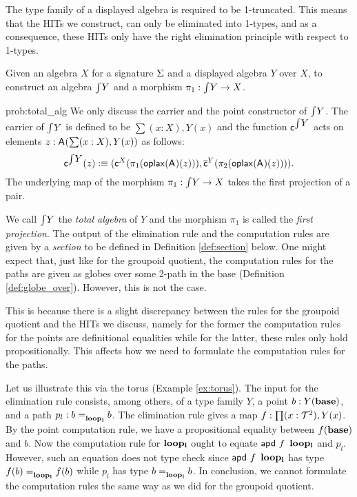 \begin{remark}
The type family of a displayed algebra is required to be 1-truncated.
This means that the HITs we construct, can only be eliminated into
1-types, and as a consequence, these HITs only have the right
elimination principle with respect to 1-types.
\end{remark}

\begin{problem}
\label{prob:total_alg}
Given an algebra $X$ for a signature $\Sigma$ and a displayed algebra $Y$ over $X$,
to construct an algebra $\textstyle \int_{}{Y}$ and a morphism $\pi_1 : \textstyle \int_{}{Y} \rightarrow X$.
\end{problem}

\begin{construction}{prob:total_alg}
We only discuss the carrier and the point constructor of $\textstyle \int_{}{Y}$.
The carrier of $\textstyle \int_{}{Y}$ is defined to be $\sum (x : X), Y(x)$
and the function $\mathsf{c}^{\textstyle \int_{}{Y}}$ acts on elements $z : \mathsf{A}^{}(\sum (x : X), Y(x))$ as follows:
\[
\mathsf{c}^{\textstyle \int_{}{Y}}(z) :\equiv
(\mathsf{c}^{X}(\pi_1(\mathsf{oplax}(\mathsf{A}^{})(z)))
,
\overline{\mathsf{c}}^{Y}(\pi_2(\mathsf{oplax}(\mathsf{A}^{})(z)))).
\]
The underlying map of the morphism $\pi_1 : \textstyle \int_{}{Y} \rightarrow X$ takes the first projection of a pair.
\end{construction}

We call $\textstyle \int_{}{Y}$ the \emph{total algebra} of $Y$ and the morphism $\pi_1$ is called the \emph{first projection}.
The output of the elimination rule and the computation rules are given by a \emph{section} to be defined in Definition \ref{def:section} below.
One might expect that, just like for the groupoid quotient, the computation rules for the paths
are given as globes over some 2-path in the base (Definition \ref{def:globe_over}).
However, this is not the case.

This is because there is a slight discrepancy between the rules for the groupoid quotient and the HITs we discuss,
namely for the former the computation rules for the points are definitional equalities
while for the latter, these rules only hold propositionally.
This affects how we need to formulate the computation rules for the paths.

Let us illustrate this via the torus (Example \ref{ex:torus}).
The input for the elimination rule consists, among others, of a type family $Y$, a point $b : Y(\operatorname{\mathbf{base}})$,
and a path $p_l : b =_{\operatorname{\mathbf{loop_l}}}^{} b$.
The elimination rule gives a map $f : \prod (x : \mathcal{T}^2) , Y(x)$.
By the point computation rule, we have a propositional equality between $f(\operatorname{\mathbf{base}})$ and $b$.
Now the computation rule for $\operatorname{\mathbf{loop_l}}$ ought to equate $\mathsf{apd} \ f \ \operatorname{\mathbf{loop_l}}$ and $p_l$.
However, such an equation does not type check since $\mathsf{apd} \ f \ \operatorname{\mathbf{loop_l}}$ has type $f(b) =_{\operatorname{\mathbf{loop_l}}}^{} f(b)$ while $p_l$ has type $b =_{\operatorname{\mathbf{loop_l}}}^{} b$.
In conclusion, we cannot formulate the computation rules the same way as we did for the groupoid quotient.

